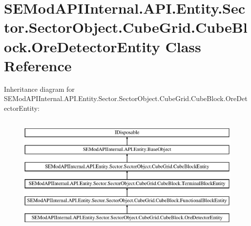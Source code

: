 \hypertarget{class_s_e_mod_a_p_i_internal_1_1_a_p_i_1_1_entity_1_1_sector_1_1_sector_object_1_1_cube_grid_1_1734c0c906221c912328658de70b50f1a}{}\section{S\+E\+Mod\+A\+P\+I\+Internal.\+A\+P\+I.\+Entity.\+Sector.\+Sector\+Object.\+Cube\+Grid.\+Cube\+Block.\+Ore\+Detector\+Entity Class Reference}
\label{class_s_e_mod_a_p_i_internal_1_1_a_p_i_1_1_entity_1_1_sector_1_1_sector_object_1_1_cube_grid_1_1734c0c906221c912328658de70b50f1a}
Inheritance diagram for S\+E\+Mod\+A\+P\+I\+Internal.\+A\+P\+I.\+Entity.\+Sector.\+Sector\+Object.\+Cube\+Grid.\+Cube\+Block.\+Ore\+Detector\+Entity\+:\begin{figure}[H]
\begin{center}
\leavevmode
\includegraphics[height=6.000000cm]{class_s_e_mod_a_p_i_internal_1_1_a_p_i_1_1_entity_1_1_sector_1_1_sector_object_1_1_cube_grid_1_1734c0c906221c912328658de70b50f1a}
\end{center}
\end{figure}
